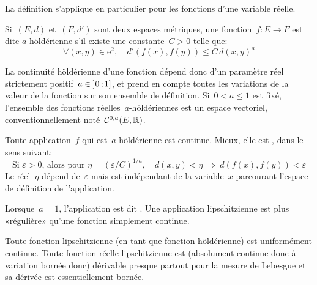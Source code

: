 La définition s'applique en particulier pour les fonctions d'une variable réelle.

\medskip
\begin{definition}
Si~$(E, d)$ et~$(F, d')$ sont deux espaces métriques, une fonction~$f: E \rightarrow F$ est dite $a$-höldérienne s'il existe une constante~$C > 0$ telle que:
\begin{equation}
  \forall (x, y) \in \mathrm{e}^2,\quad d'\left(f(x), f(y)\right) \le C\,d\left(x,y\right)^a
\end{equation}
\end{definition}
\medskip
La continuité höldérienne d'une fonction dépend donc d'un paramètre réel strictement positif~$a \in \mathopen{]}0\,;1\mathclose{]}$, et prend en compte toutes les variations de la valeur de la fonction sur son ensemble de définition.
\medskip
Si~$0 < a \le 1$ est fixé, l'ensemble des fonctions réelles~$a$-höldériennes est un espace vectoriel, conventionnellement noté~$\mathcal{C}^{0, a}(E,\mathbb R)$.

\medskip
\begin{theoreme}
Toute application~$f$ qui est~$a$-höldérienne est continue. Mieux, elle est , dans le sens suivant:
\begin{equation}
\text{Si } \varepsilon>0\text{, alors pour } \eta = \left( \varepsilon / C \right)^{1 / a},\quad d\left( x, y \right) < \eta \ \Rightarrow\ d\left( f(x), f(y) \right) < \varepsilon
\end{equation}
Le réel~$\eta$ dépend de~$\varepsilon$ mais est indépendant de la variable~$x$ parcourant l'espace de définition de l'application.
\end{theoreme}
\begin{definition}
Lorsque~$a = 1$, l'application est dit .
Une application lipschitzienne est plus «régulière» qu'une fonction simplement continue.
\end{definition}
\medskip
Toute fonction lipschitzienne (en tant que fonction höldérienne) est uniformément continue.
\medskip
Toute fonction réelle lipschitzienne est (absolument continue donc à variation bornée donc) dérivable presque partout pour la mesure de Lebesgue et sa dérivée est essentiellement bornée.
\medskip
